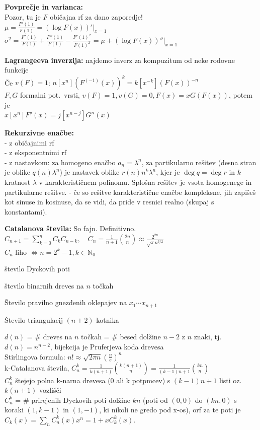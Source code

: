 \documentclass[a4paper, oneside, 12pt]{article}
\theoremstyle{definition}
\def\N{\mathbb{N}}
\newenvironment{itemize*}{\vspace{-10pt}\begin{itemize}\setlength{\itemsep}{0pt}\setlength{\parskip}{2pt}}{\end{itemize}}
\begin{document}
\textbf{Povprečje in varianca:} \\
Pozor, tu je $F$ običajna rf za dano zaporedje!\\
$\mu = \frac{F'(1)}{F(1)} = (\log F(x))' |_{x = 1}$\\
$\sigma^2 = \frac{F'(1)}{F(1)} + \frac{F''(1)}{F(1)} - \frac{F'(1)^2}{F(1)^2} = \mu + (\log F(x))'' |_{x = 1}$

\textbf{Lagrangeeva inverzija:} najdemo inverz za kompuzitum od neke rodovne funkcije\\
Če $v(F)=1$: $n[x^n](F^{(-1)}(x))^k = k [x^{-k}](F(x))^{-n}$\\
$F, G$ formalni pot.\ vrsti, $v(F) = 1, v(G) = 0, F(x) = x G(F(x))$, potem je\\
$x [x^n] F^j(x) = j [x^{n-j}]G^n(x)$

\textbf{Rekurzivne enačbe: }\\
- z običajnimi rf\\
- z eksponentnimi rf\\
- z nastavkom: za homogeno enačbo $a_n = \lambda^n$, za partikularno rešitev (desna stran je oblike $q(n) \lambda^n$) je nastavek oblike $r(n) n^k \lambda^n$, kjer je $\deg q = \deg r$ in $k$ kratnost $\lambda$ v karakterističnem polinomu. Splošna rešitev je vsota homogenege in partikularne rešitve.
- če so rešitve karakteristične enačbe kompleksne, jih zapišeš kot sinuse in kosinuse, da se vidi, da pride v resnici realno (skupaj s konstantami).

\textbf{Catalanova števila:} So fajn. Definitivno.\\
$C_{n+1} = \sum_{k=0}^n C_k C_{n-k}, \quad C_n = \frac{1}{n+1} \binom{2n}{n} \approx \frac{2^{2n}}{\sqrt{\pi} n^{3/2}}$\\
$C_n$ liho $\iff n = 2^k - 1, k \in \N_0$
\begin{itemize*}
    \item število Dyckovih poti
    \item število binarnih dreves na $n$ točkah
    \item Število pravilno gnezdenih oklepajev na $x_1\cdots x_{n+1}$
    \item Število triangulacij $(n+2)$-kotnika
\end{itemize*}
\vspace{-0.4cm}
$d(n)$ = \# dreves na $n$ točkah = \# besed dolžine $n-2$ z $n$ znaki, tj.\ $d(n) = n^{n-2}$, bijekcija je Pruferjeva koda drevesa\\
Stirlingova formula: $n! \approx \sqrt{2 \pi n} (\frac{n}{e})^n$\\
k-Catalanova števila, $C_n^k = \frac{1}{k(n+1)}\binom{k(n+1)}{n} = \frac{1}{(k-1)n +1}\binom{kn}{n}$\\
$C_n^k$ štejejo polna k-narna drevesa (0 ali k potpmcev) s $(k-1)n+1$ listi oz.\ $k(n+1)$ vozlišči\\
$C_n^k$ = \# prirejenih Dyckovih poti dolžine $kn$ (poti od $(0,0)$ do $(kn,0)$ s koraki $(1, k-1)$ in $(1, -1)$, ki nikoli ne gredo pod x-os), orf za te poti je $C_k (x) = \sum_n C_n^k(x) x^n = 1 + x C_k^k(x)$.
\end{document}
